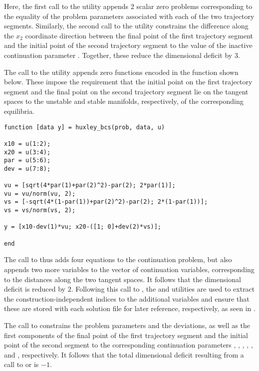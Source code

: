 Here, the first call to the  utility appends $2$ scalar zero problems corresponding to the equality of the problem parameters associated with each of the two trajectory segments. Similarly, the second call to the  utility constrains the difference along the $x_2$ coordinate direction between the final point of the first trajectory segment and the initial point of the second trajectory segment to the value of the inactive continuation parameter . Together, these reduce the dimensional deficit by $3$.

The call to the  utility appends zero functions encoded in the function  shown below. These impose the requirement that the initial point on the first trajectory segment and the final point on the second trajectory segment lie on the tangent spaces to the unstable and stable manifolds, respectively, of the corresponding equilibria.
\begin{lstlisting}[language=coco-highlight]
function [data y] = huxley_bcs(prob, data, u)

x10 = u(1:2);
x20 = u(3:4);
par = u(5:6);
dev = u(7:8);

vu = [sqrt(4*par(1)+par(2)^2)-par(2); 2*par(1)];
vu = vu/norm(vu, 2);
vs = [-sqrt(4*(1-par(1))+par(2)^2)-par(2); 2*(1-par(1))];
vs = vs/norm(vs, 2);

y = [x10-dev(1)*vu; x20-([1; 0]+dev(2)*vs)];

end
\end{lstlisting}
The call to  thus adds four equations to the continuation problem, but also appends two more variables to the vector of continuation variables, corresponding to the distances along the two tangent spaces. It follows that the dimensional deficit is reduced by $2$. Following this call to , the  and  utilities are used to extract the construction-independent indices to the additional variables and ensure that these are stored with each solution file for later reference, respectively, as seen in .

The call to  constrains the problem parameters and the deviations, as well as the first components of the final point of the first trajectory segment and the initial point of the second segment to the corresponding continuation parameters , , , , , and , respectively. It follows that the total dimensional deficit resulting from a call to  or  is $-1$.

